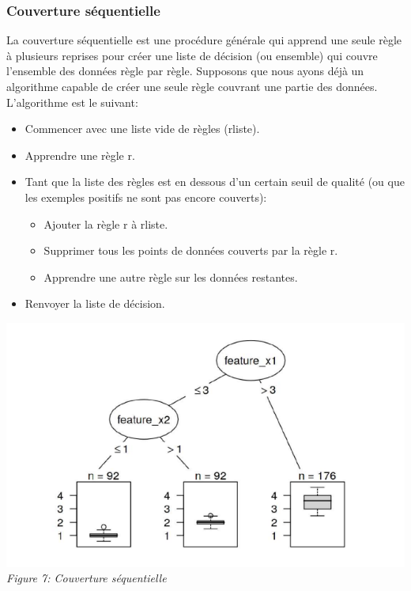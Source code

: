 \subsubsection{Couverture séquentielle}

La couverture séquentielle est une procédure générale qui apprend une seule règle à plusieurs reprises pour créer une liste de décision (ou ensemble) qui couvre l'ensemble des données règle par règle. Supposons que nous ayons déjà un algorithme capable de créer une seule règle couvrant une partie des données. L'algorithme est le suivant:
\begin{itemize}
    \item Commencer avec une liste vide de règles (rliste).
    \item Apprendre une règle r.
    \item Tant que la liste des règles est en dessous d'un certain seuil de qualité (ou que les exemples positifs ne sont pas encore couverts):
    \begin{itemize}
        \item Ajouter la règle r à rliste.
        \item Supprimer tous les points de données couverts par la règle r.
        \item Apprendre une autre règle sur les données restantes.
    \end{itemize}
    \item Renvoyer la liste de décision.
\end{itemize}


\begin{center}
    \centering
    \includegraphics[width=0.5\linewidth]{Images/cart.png}
    \\
    \emph{Figure 7: Couverture séquentielle}
    \\
\end{center}
\\
